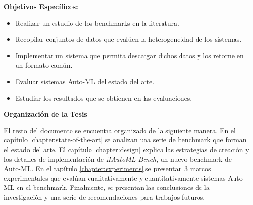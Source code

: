\begin{flushleft} 
\textbf{Objetivos Específicos:}
\begin{itemize}
    \item Realizar un estudio de los benchmarks en la literatura.
    \item Recopilar conjuntos de datos que evalúen la heterogeneidad de los sistemas.
    \item Implementar un sistema que permita descargar dichos datos y los retorne en un formato común.  
    \item Evaluar sistemas Auto-ML del estado del arte.
    \item Estudiar los resultados que se obtienen en las evaluaciones.
\end{itemize}
\end{flushleft} 

\begin{flushleft} 
    {\Large {\textbf{Organización de la Tesis}}}
\end{flushleft}

El resto del documento se encuentra organizado de la siguiente manera. En
el capítulo \ref{chapter:state-of-the-art} se analizan una serie de benchmark que forman el estado
del arte. El capítulo \ref{chapter:design} explica las estrategias de creación y los detalles de implementación de \textit{HAutoML-Bench}, un nuevo benchmark de Auto-ML.
En el capítulo \ref{chapter:experiments} se presentan 3 marcos experimentales que evalúan cualitativamente y cuantitativamente sistemas Auto-ML en el benchmark. 
Finalmente, se presentan las conclusiones de la investigación y una serie de recomendaciones para trabajos futuros. 
